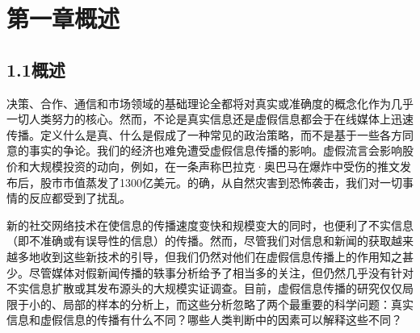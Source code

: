 \documentclass[a4paper,AutoFakeBold,oneside,12pt]{book}
\begin{document}
\newpage\backmatter

\begin{center}
\end{center}
\vspace{8mm}
\thispagestyle{empty}


\begin{center}
\sihao{}

\xiaosihao{}

\xiaosihao{}
\end{center}

\songti{}
\let\clearpage\relax


\chapter*{第一章\quad{}概述}
\thispagestyle{empty}
\section*{1.1\quad{}概述}
决策、合作、通信和市场领域的基础理论全都将对真实或准确度的概念化作为几乎一切人类努力的核心。然而，不论是真实信息还是虚假信息都会于在线媒体上迅速传播。定义什么是真、什么是假成了一种常见的政治策略，而不是基于一些各方同意的事实的争论。我们的经济也难免遭受虚假信息传播的影响。虚假流言会影响股价和大规模投资的动向，例如，在一条声称巴拉克·奥巴马在爆炸中受伤的推文发布后，股市市值蒸发了1300亿美元。的确，从自然灾害到恐怖袭击，我们对一切事情的反应都受到了扰乱。

新的社交网络技术在使信息的传播速度变快和规模变大的同时，也便利了不实信息（即不准确或有误导性的信息）的传播。然而，尽管我们对信息和新闻的获取越来越多地收到这些新技术的引导，但我们仍然对他们在虚假信息传播上的作用知之甚少。尽管媒体对假新闻传播的轶事分析给予了相当多的关注，但仍然几乎没有针对不实信息扩散或其发布源头的大规模实证调查。目前，虚假信息传播的研究仅仅局限于小的、局部的样本的分析上，而这些分析忽略了两个最重要的科学问题：真实信息和虚假信息的传播有什么不同？哪些人类判断中的因素可以解释这些不同？
\end{document}
